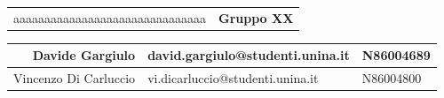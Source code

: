 


\thispagestyle{empty}

\color{white}
\pagecolor{pantoneRed}
\afterpage{\pagecolor{white}\nopagecolor}

\begin{center}
    \rule{0pt}{2cm}
    \begin{tabular}{lr}
        \color{pantoneRed} aaaaaaaaaaaaaaaaaaaaaaaaaaaaaaa & \Large \color{white}\textbf{Gruppo XX}\\
    \end{tabular}
    \newline
    \begin{tabular}{r|l|l}
        \large Davide Gargiulo & \large david.gargiulo@studenti.unina.it & \large N86004689   \\\hline
        \large Vincenzo Di Carluccio & \large vi.dicarluccio@studenti.unina.it & \large N86004800 \\
    \end{tabular}
\end{center}


